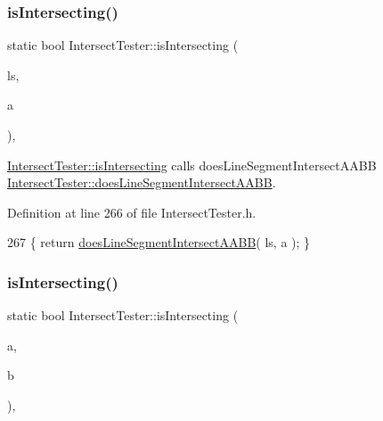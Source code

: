 \subsubsection{\texorpdfstring{is\+Intersecting()}{isIntersecting()}\hspace{0.1cm}{\footnotesize\ttfamily [9/15]}}
{\footnotesize\ttfamily static bool Intersect\+Tester\+::is\+Intersecting (\begin{DoxyParamCaption}\item[{\hyperlink{class_line_segment}{Line\+Segment}}]{ls,  }\item[{\hyperlink{class_a_a_b_b}{A\+A\+BB}}]{a }\end{DoxyParamCaption})\hspace{0.3cm}{\ttfamily [inline]}, {\ttfamily [static]}}



\hyperlink{class_intersect_tester_a7710e17ff7d2e229059f23b9429213f5}{Intersect\+Tester\+::is\+Intersecting} calls does\+Line\+Segment\+Intersect\+A\+A\+BB  \hyperlink{class_intersect_tester_a817105ec3f73e20066121d7d9d85a3ae}{Intersect\+Tester\+::does\+Line\+Segment\+Intersect\+A\+A\+BB}. 



Definition at line 266 of file Intersect\+Tester.\+h.


\begin{DoxyCode}
267     \{ \textcolor{keywordflow}{return} \hyperlink{class_intersect_tester_a817105ec3f73e20066121d7d9d85a3ae}{doesLineSegmentIntersectAABB}( ls, a ); \}
\end{DoxyCode}
\mbox{\label{class_intersect_tester_a3f908e959ef38b2591582b8796ed2efd}} 
\subsubsection{\texorpdfstring{is\+Intersecting()}{isIntersecting()}\hspace{0.1cm}{\footnotesize\ttfamily [10/15]}}
{\footnotesize\ttfamily static bool Intersect\+Tester\+::is\+Intersecting (\begin{DoxyParamCaption}\item[{\hyperlink{class_circle}{Circle}}]{a,  }\item[{\hyperlink{class_circle}{Circle}}]{b }\end{DoxyParamCaption})\hspace{0.3cm}{\ttfamily [inline]}, {\ttfamily [static]}}



